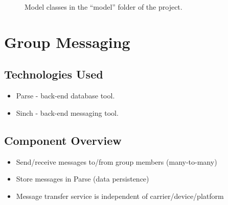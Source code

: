 	\begin{figure}[tbh!]
	\begin{center}
	\end{center}
	\caption{Model classes in the ``model'' folder of the project. \label{ViewsFolder}}
	\end{figure}

\section{Group Messaging }

\subsection{Technologies  Used}
\begin{itemize}
  \item Parse - back-end database tool.
  \item Sinch - back-end messaging tool.
\end{itemize}

\subsection{Component  Overview}
\begin{itemize}
  \item Send/receive messages to/from group members (many-to-many)
  \item Store messages in Parse (data persistence)
  \item Message transfer service is independent of carrier/device/platform
\end{itemize} 


